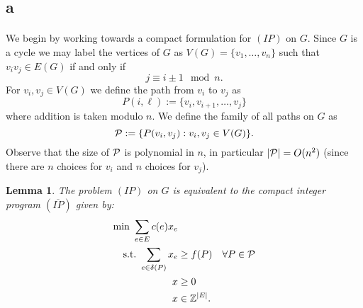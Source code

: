 \documentclass[letterpaper,12pt,oneside,onecolumn]{article}
\newtheorem{lemma}[fact]{Lemma}
\begin{document}
\subsection*{a}
\paragraph{}
We begin by working towards a compact formulation for $(IP)$ on $G$. Since $G$ is a cycle we may label the vertices of $G$ as $V(G) = \{v_1,\dots, v_n\}$ such that $v_iv_j \in E(G)$ if and only if $$j \equiv i\pm1\mod n.$$ For $v_i, v_j \in V(G)$ we define the path from $v_i$ to $v_j$ as 
$$P(i, \ell) := \{v_i, v_{i+1}, \dots, v_{j} \}$$
where addition is taken modulo $n$. We define the family of all paths on $G$ as
$$\mathcal{P} := \{P(v_i, v_j) : v_i, v_j \in V(G)\}.$$
Observe that the size of $\mathcal{P}$ is polynomial in $n$, in particular $|\mathcal{P}| = O(n^2)$ (since there are $n$ choices for $v_i$ and $n$ choices for $v_j$).
\begin{lemma}\label{lemma:compact}
The problem $(IP)$ on $G$ is equivalent to the compact integer program $(\overline{IP})$ given by:
\begin{align*}
\min\ \sum_{e\in E} c(e) x_e&\\
\text{s.t.}\  \sum_{e\in\delta(P)} x_e &\geq f(P) &\forall P \in \mathcal{P} \\
x&\geq 0 \\
x&\in \mathbb{Z}^{|E|}.
\end{align*}
\end{lemma}
\end{document}
